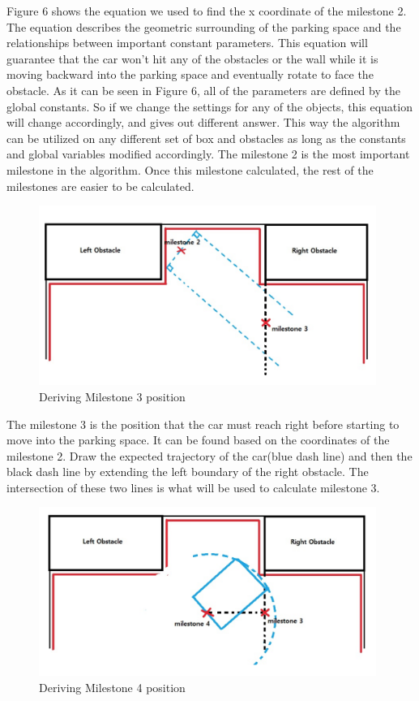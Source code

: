 \documentclass[12pt, letterpaper]{amsart} %
\numberwithin{equation}{section}
\begin{document}
Figure 6 shows the equation we used to find the x 
coordinate of the milestone 2. The equation describes 
the geometric surrounding of the parking space and the
relationships between important constant parameters.
This equation will guarantee that the car won’t hit any
of the obstacles or the wall while it is moving backward into the parking space and eventually rotate to face the obstacle.
As it can be seen in Figure 6, all of the parameters 
are defined by the global constants. So if we change 
the settings for any of the objects, this equation will 
change accordingly, and gives out different answer.
This way the algorithm can be utilized on any different set of box and obstacles as long as the constants and global variables modified accordingly. 
The milestone 2 is the most important milestone in the algorithm. Once this milestone calculated, the rest of the milestones are easier to be calculated. 

\begin{figure}[h!]
\includegraphics[width=110mm]{./img/fig_10.png}
\caption{Deriving Milestone 3 position}
\label{fig:figure10}	
\end{figure}

The milestone 3 is the position that the car must reach right before starting to move into the parking space. It can be found based on the coordinates of the milestone 2. 
Draw the expected trajectory of the car(blue dash line) and then the black dash line by extending the left boundary of the right obstacle. The intersection of these two lines is what will be used to calculate milestone 3. 
\newpage
\begin{figure}[h!]
\includegraphics[width=110mm]{./img/fig_11.png}
\caption{Deriving Milestone 4 position}
\label{fig:figure11}	
\end{figure}
\end{document}
